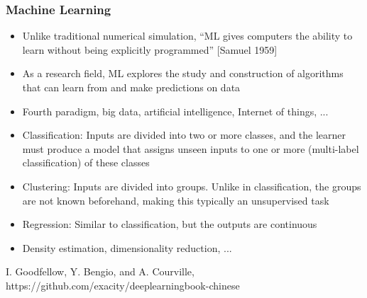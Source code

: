 \begin{frame}
  \MyLogo
  \frametitle{Machine Learning}  
\small
\smallskip

\begin{itemize}

\item Unlike traditional numerical simulation, ``ML gives computers the ability to learn without being explicitly programmed'' {\footnotesize\color{DarkOrchid}[Samuel 1959]}

\item As a research field, ML explores the study and construction of algorithms that can \alert{learn} from and \alert{make predictions} on \alert{data}

\item Fourth paradigm, big data, artificial intelligence, Internet of things, ...

\end{itemize}


\begin{itemize}

\item Classification: Inputs are divided into two or more classes, and the learner must produce a model that assigns unseen inputs to one or more (multi-label classification) of these classes

\item Clustering: Inputs are divided into groups. Unlike in classification, the groups are not known beforehand, making this typically an unsupervised task

\item Regression: Similar to classification, but the outputs are continuous

\item Density estimation, dimensionality reduction, ...

\end{itemize}

\begin{center}
{\color{red} \scriptsize
I. Goodfellow, Y. Bengio, and A. Courville,
https://github.com/exacity/deeplearningbook-chinese
}
\end{center}
\end{frame}


